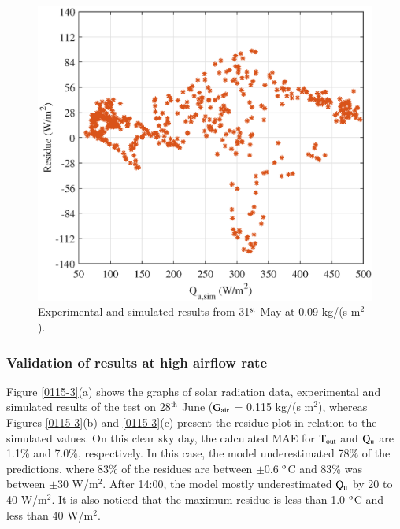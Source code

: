 \begin{figure}[ht!]
\begin{minipage}{0.39\columnwidth}
		\includegraphics[scale=0.5,width=1.0\columnwidth]{figs/009-residue-6.eps}
	\end{minipage}
	
	\caption{Experimental and simulated results from 31$^{\rm{st}}$ May at 0.09 kg/(s m$^2$).}
	\label{009-3}
\end{figure}


\subsubsection{Validation of results at high airflow rate}

Figure \ref{0115-3}(a) shows the graphs of solar radiation data, experimental and simulated results of the test on 28$^{\rm{th}}$ June ($\rm{G_{air}}$ = 0.115 kg/(s m$^2$), whereas Figures \ref{0115-3}(b) and \ref{0115-3}(c) present the residue plot in relation to the simulated values. On this clear sky day, the calculated MAE for $\rm{T_{out}}$ and $\rm{Q_{u}}$ are 1.1\% and 7.0\%, respectively. In this case, the model underestimated 78\% of the predictions, where 83\% of the residues are between $\pm$0.6 $^{\rm{o}}$C and 83\% was between $\pm$30 W/m$^2$. After 14:00, the model mostly underestimated $\rm{Q_{u}}$ by 20 to 40 W/m$^2$. It is also noticed that the maximum residue is less than 1.0 $^{\rm{o}}$C and less than 40 W/m$^2$.

